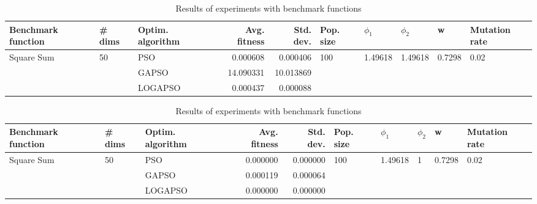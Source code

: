 \documentclass{article}
\begin{document}
\begin{table}
\centering
\caption{Results of experiments with benchmark functions}
\begin{tabular}{lllrrlllll}
\toprule
         Benchmark function &             \# dims & Optim. algorithm &  Avg. fitness &  Std. dev. &            Pop. size &               $\phi_{1}$ &               $\phi_{2}$ &                       w &         Mutation rate \\
\midrule
\multirow{3}{*}{Square Sum} & \multirow{3}{*}{50} &              PSO &      0.000608 &   0.000406 & \multirow{3}{*}{100} & \multirow{3}{*}{1.49618} & \multirow{3}{*}{1.49618} & \multirow{3}{*}{0.7298} & \multirow{3}{*}{0.02} \\
                            &                     &            GAPSO &     14.090331 &  10.013869 &                      &                          &                          &                         &                       \\
                            &                     &          LOGAPSO &      0.000437 &   0.000088 &                      &                          &                          &                         &                       \\
\bottomrule
\end{tabular}
\end{table}
\begin{table}
\centering
\caption{Results of experiments with benchmark functions}
\begin{tabular}{lllrrlllll}
\toprule
         Benchmark function &             \# dims & Optim. algorithm &  Avg. fitness &  Std. dev. &            Pop. size &               $\phi_{1}$ &         $\phi_{2}$ &                       w &         Mutation rate \\
\midrule
\multirow{3}{*}{Square Sum} & \multirow{3}{*}{50} &              PSO &      0.000000 &   0.000000 & \multirow{3}{*}{100} & \multirow{3}{*}{1.49618} & \multirow{3}{*}{1} & \multirow{3}{*}{0.7298} & \multirow{3}{*}{0.02} \\
                            &                     &            GAPSO &      0.000119 &   0.000064 &                      &                          &                    &                         &                       \\
                            &                     &          LOGAPSO &      0.000000 &   0.000000 &                      &                          &                    &                         &                       \\
\bottomrule
\end{tabular}
\end{table}
\end{document}
